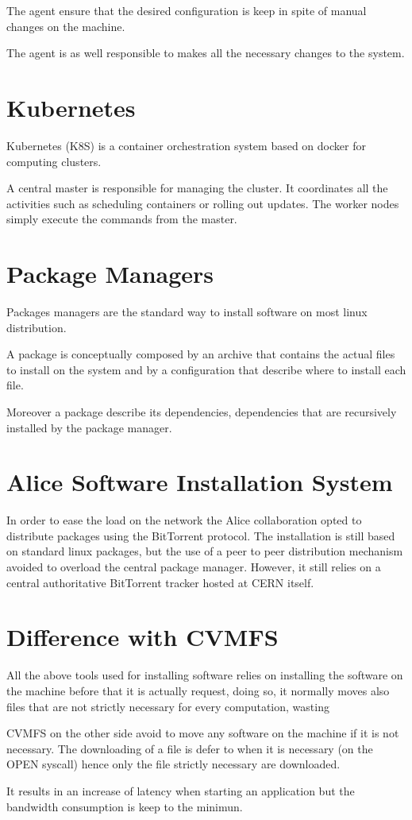 The agent ensure that the desired configuration is keep in spite of manual changes on the machine.

The agent is as well responsible to makes all the necessary changes to the system. 

\section{Kubernetes}

Kubernetes (K8S) is a container orchestration system based on docker for computing clusters.

A central master is responsible for managing the cluster. It coordinates all the activities such as scheduling containers or rolling out updates. The worker nodes simply execute the commands from the master.

\section{Package Managers}

Packages managers are the standard way to install software on most linux distribution.

A package is conceptually composed by an archive that contains the actual files to install on the system and by a configuration that describe where to install each file.

Moreover a package describe its dependencies, dependencies that are recursively installed by the package manager.

\section{Alice Software Installation System}

In order to ease the load on the network the Alice collaboration opted to distribute packages using the BitTorrent protocol.
The installation is still based on standard linux packages, but the use of a peer to peer distribution mechanism avoided to overload the central package manager.
However, it still relies on a central authoritative BitTorrent tracker hosted at CERN itself.

\section{Difference with CVMFS}

All the above tools used for installing software relies on installing the software on the machine before that it is actually request, doing so, it normally moves also files that are not strictly necessary for every computation, wasting 

CVMFS on the other side avoid to move any software on the machine if it is not necessary. The downloading of a file is defer to when it is necessary (on the OPEN syscall) hence only the file strictly necessary are downloaded.

It results in an increase of latency  when starting an application but the bandwidth consumption is keep to the minimun.

